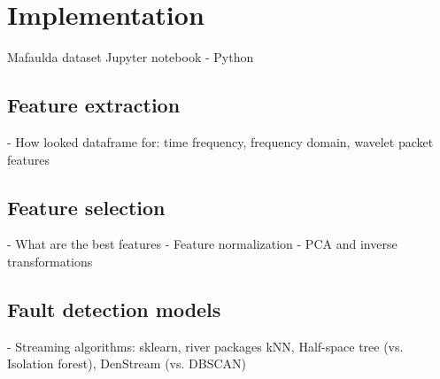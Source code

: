 \chapter{Implementation} \label{section:implementation} 
Mafaulda dataset
Jupyter notebook - Python

\section{Feature extraction}
- How looked dataframe for: time frequency, frequency domain, wavelet packet features

\section{Feature selection}
- What are the best features
- Feature normalization
- PCA and inverse transformations


\section{Fault detection models}
- Streaming algorithms: sklearn, river packages
kNN, Half-space tree (vs. Isolation forest),  DenStream (vs. DBSCAN)
